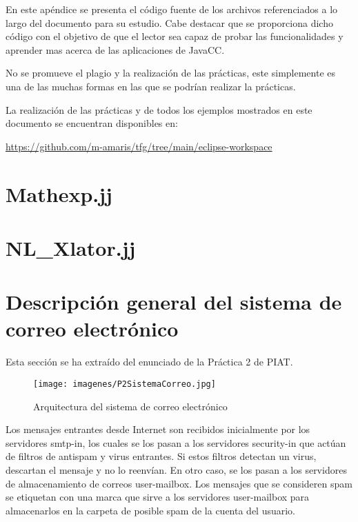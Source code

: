 
\noindent En este apéndice se presenta el código fuente de los archivos referenciados a lo largo del documento para su estudio. Cabe destacar que se proporciona dicho código con el objetivo de que el lector sea capaz de probar las funcionalidades y aprender mas acerca de las aplicaciones de JavaCC.

No se promueve el plagio y la realización de las prácticas, este simplemente es una de las muchas formas en las que se podrían realizar la prácticas.

La realización de las prácticas y de todos los ejemplos mostrados en este documento se encuentran disponibles en:

\href{https://github.com/m-amaris/tfg/tree/main/eclipse-workspace}{https://github.com/m-amaris/tfg/tree/main/eclipse-workspace}

\pagestyle{empty}


\section{Mathexp.jj}
\label{sec:mathexp}
\lstset{inputencoding=utf8/latin1}


\newpage
\section{NL\_Xlator.jj}
\label{sec:nlxlator}
\lstset{inputencoding=utf8/latin1}


\newpage
\section{Descripción general del sistema de correo electrónico}
\label{sec:P2SistemaCorreo}

\noindent Esta sección se ha extraído del enunciado de la Práctica 2 de PIAT.

\begin{figure}[H]
	\centering
	\texttt{[image: imagenes/P2SistemaCorreo.jpg]}
	\caption{\label{fig:P2SistemaCorreo.jpg}Arquitectura del sistema de correo electrónico\cite{pdfpractica2} }
\end{figure}

\noindent Los mensajes entrantes desde Internet son recibidos inicialmente por los servidores smtp-in, los cuales se los pasan a los servidores security-in que actúan de filtros de antispam y virus entrantes. Si estos filtros detectan un virus, descartan el mensaje y no lo reenvían. En otro caso, se los pasan a los servidores de almacenamiento de correos user-mailbox. Los mensajes que se consideren spam se etiquetan con una marca que sirve a los servidores user-mailbox para almacenarlos en la carpeta de posible spam de la cuenta del usuario.

